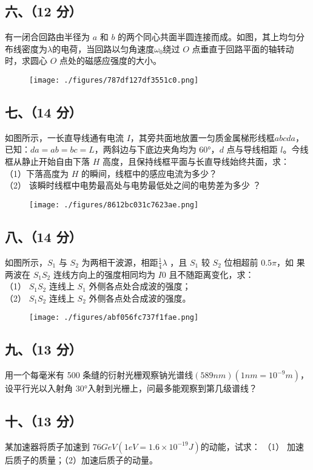 \subsection{六、（12 分）}
有一闭合回路由半径为 $a$ 和 $b$ 的两个同心共面半圆连接而成。如图，其上均匀分布线密度为$\lambda$的电荷，当回路以匀角速度$\omega_0$绕过 $O$ 点垂直于回路平面的轴转动时，求圆心 $O$ 点处的磁感应强度的大小。
\begin{figure}[ht]
\centering
\texttt{[image: ./figures/787df127df3551c0.png]}
\caption{} \label{fig_NJUD4_5}
\end{figure}
\subsection{七、（14 分）}
如图所示，一长直导线通有电流 $I$，其旁共面地放置一匀质金属梯形线框$abcda$，已知：$da=ab=bc=L$，两斜边与下底边夹角均为 60°，$d$ 点与导线相距 $l$。今线框从静止开始自由下落 $H$ 高度，且保持线框平面与长直导线始终共面，求：\\
（1）下落高度为 $H$ 的瞬间，线框中的感应电流为多少？\\
（2） 该瞬时线框中电势最高处与电势最低处之间的电势差为多少 ？
\begin{figure}[ht]
\centering
\texttt{[image: ./figures/8612bc031c7623ae.png]}
\caption{} \label{fig_NJUD4_6}
\end{figure}
\subsection{八、（14 分）}
如图所示，$S_1$ 与 $S_2$ 为两相干波源，相距$\frac{1}{4}\lambda$ ，且 $S_1$ 较 $S_2$ 位相超前 $0.5\pi$，如
果两波在 $S_1S_2$ 连线方向上的强度相同均为 $I0$ 且不随距离变化，求：\\
（1） $S_1S_2$ 连线上 $S_1$ 外侧各点处合成波的强度；\\
（2） $S_1S_2$ 连线上 $S_2$ 外侧各点处合成波的强度。
\begin{figure}[ht]
\centering
\texttt{[image: ./figures/abf056fc737f1fae.png]}
\caption{} \label{fig_NJUD4_7}
\end{figure}
\subsection{九、（13 分）}
用一个每毫米有 500 条缝的衍射光栅观察钠光谱线$(589nm)(1nm=10^{-9}m)$，设平行光以入射角 30°入射到光栅上，问最多能观察到第几级谱线？
\subsection{十、（13 分）}
某加速器将质子加速到 $76GeV(1eV=1.6\times10^{-19}J)$的动能，试求：
（1） 加速后质子的质量；（2）加速后质子的动量。
